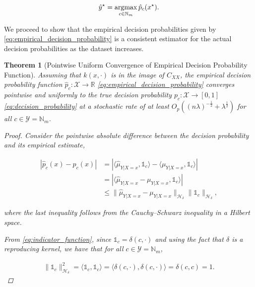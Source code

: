 \documentclass{article}
\newcommand{\argmax}{\operatornamewithlimits{argmax}}
\newtheorem{theorem}{Theorem}[section]
\begin{document}
	\begin{equation}
		\hat{y}^{\star} = \argmax_{c \in \mathbb{N}_{m}} \hat{p}_{c}(x^{\star}).
	\label{eq:classification}
	\end{equation}

	We proceed to show that the empirical decision probabilities given by \eqref{eq:empirical_decision_probability} is a consistent estimator for the actual decision probabilities as the dataset increases.
	
	\begin{theorem}[Pointwise Uniform Convergence of Empirical Decision Probability Function]
	\label{thm:probability_convergence}
		Assuming that $k(x, \cdot)$ is in the image of $C_{XX}$, the empirical decision probability function $\hat{p}_{c} : \mathcal{X} \to \mathbb{R}$ \eqref{eq:empirical_decision_probability} converges pointwise and uniformly to the true decision probability $p_{c} : \mathcal{X} \to [0, 1]$ \eqref{eq:decision_probability} at a stochastic rate of at least $O_{p}((n \lambda)^{-\frac{1}{2}} + \lambda^{\frac{1}{2}})$ for all $c \in \mathcal{Y} = \mathbb{N}_{m}$.
		
	\begin{proof}
		Consider the pointwise absolute difference between the decision probability and its empirical estimate,
		
		\begin{equation}
		\begin{aligned}
			| \hat{p}_{c}(x) - p_{c}(x) | &= | \langle \hat{\mu}_{Y | X = x}, \mathbb{1}_{c} \rangle - \langle \mu_{Y | X = x}, \mathbb{1}_{c} \rangle | \\
			&= | \langle \hat{\mu}_{Y | X = x} - \mu_{Y | X = x}, \mathbb{1}_{c} \rangle | \\
			&\leq \big\| \hat{\mu}_{Y | X = x} - \mu_{Y | X = x} \big\|_{\mathcal{H}_{\delta}} \big\| \mathbb{1}_{c} \big\|_{\mathcal{H}_{\delta}},
		\end{aligned}
		\end{equation}
		
		where the last inequality follows from the Cauchy–Schwarz inequality in a Hilbert space.
		
		From \eqref{eq:indicator_function}, since $\mathbb{1}_{c} = \delta(c, \cdot)$ and using the fact that $\delta$ is a reproducing kernel, we have that for all $c \in \mathcal{Y} = \mathbb{N}_{m}$,
		
		\begin{equation}
		\begin{aligned}
			\big\| \mathbb{1}_{c} \big\|_{\mathcal{H}_{\delta}}^{2} = \langle \mathbb{1}_{c}, \mathbb{1}_{c} \rangle = \langle \delta(c, \cdot), \delta(c, \cdot) \rangle = \delta(c, c) = 1.
		\end{aligned}
		\end{equation}
		

\end{proof}
\end{theorem}
\end{document}
